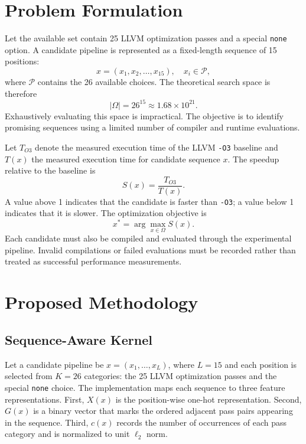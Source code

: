 \section{Problem Formulation}
Let the available set contain 25 LLVM optimization passes and a special \texttt{none} option. A candidate pipeline is represented as a fixed-length sequence of 15 positions:
\begin{equation}
x = (x_1, x_2, \ldots, x_{15}), \quad x_i \in \mathcal{P},
\end{equation}
where $\mathcal{P}$ contains the 26 available choices. The theoretical search space is therefore
\begin{equation}
|\Omega| = 26^{15} \approx 1.68 \times 10^{21}.
\end{equation}
Exhaustively evaluating this space is impractical. The objective is to identify promising sequences using a limited number of compiler and runtime evaluations.

Let $T_{O3}$ denote the measured execution time of the LLVM \texttt{-O3} baseline and $T(x)$ the measured execution time for candidate sequence $x$. The speedup relative to the baseline is
\begin{equation}
S(x) = \frac{T_{O3}}{T(x)}.
\end{equation}
A value above 1 indicates that the candidate is faster than \texttt{-O3}; a value below 1 indicates that it is slower. The optimization objective is
\begin{equation}
x^{*} = \arg\max_{x \in \Omega} S(x).
\end{equation}
Each candidate must also be compiled and evaluated through the experimental pipeline. Invalid compilations or failed evaluations must be recorded rather than treated as successful performance measurements.

\section{Proposed Methodology}
\subsection{Sequence-Aware Kernel}
Let a candidate pipeline be $x = (x_1, \ldots, x_L)$, where $L = 15$ and each position is selected from $K = 26$ categories: the 25 LLVM optimization passes and the special \texttt{none} choice. The implementation maps each sequence to three feature representations. First, $X(x)$ is the position-wise one-hot representation. Second, $G(x)$ is a binary vector that marks the ordered adjacent pass pairs appearing in the sequence. Third, $c(x)$ records the number of occurrences of each pass category and is normalized to unit $\ell_2$ norm.


